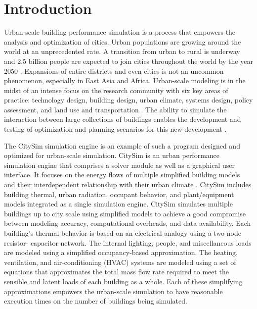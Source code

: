\documentclass{tBPS2e}
\theoremstyle{plain}
\theoremstyle{definition}
\theoremstyle{remark}
\begin{document}
\linenumbers

\section{Introduction}

Urban-scale building performance simulation is a process that empowers the
analysis and optimization of cities. Urban populations are growing around the
world at an unprecedented rate. A transition from urban to rural is underway and
2.5 billion people are expected to join cities throughout the world by the year 2050
\citep{united_nations_world_2014}. Expansions of entire districts and even cities
is not an uncommon phenomenon, especially in East Asia and Africa. Urban-scale
modeling is in the midst of an intense focus on the research community with
six key areas of practice: technology design, building design, urban climate,
systems design, policy assessment, and land use and transportation
\citep{keirstead_review_2012}. The ability to simulate the interaction between
large collections of buildings enables the development and testing of
optimization and planning scenarios for this new development
\citep{dorer_modelling_2013}.

The CitySim simulation engine is an example of such a program designed and
optimized for urban-scale simulation. CitySim is an urban performance
simulation engine that comprises a solver module as well as a graphical user
interface. It focuses on the energy flows of multiple simplified building
models and their interdependent relationship with their urban climate
\citep{robinson_citysim:_2009}. CitySim includes building thermal, urban radiation,
occupant behavior, and plant/equipment models integrated as a single
simulation engine. CitySim simulates multiple buildings up to city scale using
simplified models to achieve a good compromise between modeling
accuracy, computational overheads, and data availability. Each building's
thermal behavior is based on an electrical analogy using a two node resistor-
capacitor network. The internal lighting, people, and miscellaneous loads are
modeled using a simplified occupancy-based approximation. The heating,
ventilation, and air-conditioning (HVAC) systems are modeled using a
set of equations that approximates the total mass flow rate required to meet the
sensible and latent loads of each building as a whole. Each of these
simplifying approximations empowers the urban-scale simulation to have
reasonable execution times on the number of buildings being
simulated.
\end{document}

